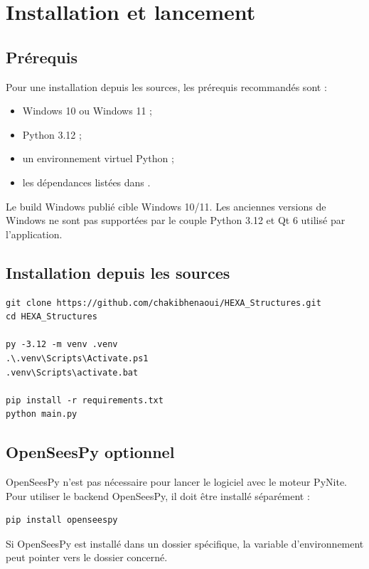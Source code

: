 \chapter{Installation et lancement}

\section{Prérequis}

Pour une installation depuis les sources, les prérequis recommandés sont :

\begin{itemize}
  \item Windows 10 ou Windows 11 ;
  \item Python 3.12 ;
  \item un environnement virtuel Python ;
  \item les dépendances listées dans .
\end{itemize}

Le build Windows publié cible Windows 10/11. Les anciennes versions de Windows
ne sont pas supportées par le couple Python 3.12 et Qt 6 utilisé par
l'application.

\section{Installation depuis les sources}

\begin{verbatim}
git clone https://github.com/chakibhenaoui/HEXA_Structures.git
cd HEXA_Structures

py -3.12 -m venv .venv
.\.venv\Scripts\Activate.ps1
.venv\Scripts\activate.bat

pip install -r requirements.txt
python main.py
\end{verbatim}

\section{OpenSeesPy optionnel}

OpenSeesPy n'est pas nécessaire pour lancer le logiciel avec le moteur PyNite.
Pour utiliser le backend OpenSeesPy, il doit être installé séparément :

\begin{verbatim}
pip install openseespy
\end{verbatim}

Si OpenSeesPy est installé dans un dossier spécifique, la variable
d'environnement  peut pointer vers le dossier
 concerné.

